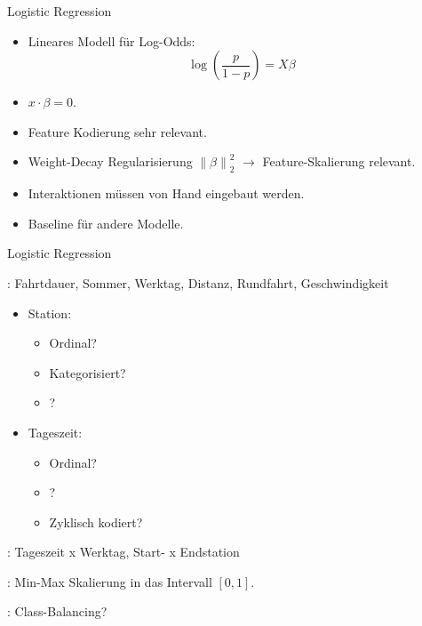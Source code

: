 \begin{frame}{Logistic Regression}
{
\begin{itemize}
\item Lineares Modell für Log-Odds:
\begin{equation}
\log(\frac{p}{1-p}) = X\beta
\end{equation}
\item {} $x \cdot \beta = 0$.
\item Feature Kodierung sehr relevant.
\item Weight-Decay Regularisierung $\left\lVert\beta\right\rVert_2^2$ $\rightarrow$ Feature-Skalierung relevant.
\item Interaktionen müssen von Hand eingebaut werden.
\item Baseline für andere Modelle.
\end{itemize}
}
\end{frame}

\begin{frame}{Logistic Regression}
{
: Fahrtdauer, Sommer, Werktag, Distanz, Rundfahrt, Geschwindigkeit
\vspace{-0.4cm}
\begin{multicols}{2}
\begin{itemize}
\item Station:
\begin{itemize}
\item Ordinal?
\item Kategorisiert?
\item {}?
\end{itemize}
\item Tageszeit:
\begin{itemize}
\item Ordinal?
\item {}?
\item Zyklisch kodiert?
\end{itemize}
\end{itemize}
\end{multicols}

: Tageszeit x Werktag, Start- x Endstation

: Min-Max Skalierung in das Intervall $[0,1]$.

: Class-Balancing?
}
\end{frame}


